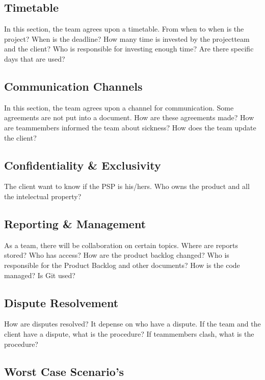 \documentclass[10pt]{report}
\begin{document}
\subsection{Timetable}

In this section, the team agrees upon a timetable. From when to when is the project? When is the deadline? How many time is invested by the projectteam and the client? Who is responsible for investing enough time? Are there specific days that are used?

\subsection{Communication Channels}

In this section, the team agrees upon a channel for communication. Some agreements are not put into a document. How are these agreements made? How are teammembers informed the team about sickness? How does the team update the client?

\subsection{Confidentiality \& Exclusivity}

The client want to know if the PSP is his/hers. Who owns the product and all the intelectual property? 

\subsection{Reporting \& Management}

As a team, there will be collaboration on certain topics. Where are reports stored? Who has access? How are the product backlog changed? Who is responsible for the Product Backlog and other documents? How is the code managed? Is Git used?

\subsection{Dispute Resolvement}

How are disputes resolved? It depense on who have a dispute. If the team and the client have a dispute, what is the procedure? If teammembers clash, what is the procedure?

\subsection{Worst Case Scenario's}
\end{document}
